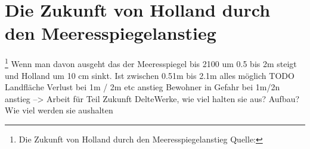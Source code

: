 \section{Die Zukunft von Holland durch den Meeresspiegelanstieg} \footnote{Die Zukunft von Holland durch den Meeresspiegelanstieg Quelle: }
Wenn man davon ausgeht das der Meeresspiegel bis 2100 um 0.5 bis 2m steigt und Holland um 10 cm sinkt.
Ist zwischen 0.51m bis 2.1m alles möglich 
\newline
\newline
\color{red}  
TODO \newline
Landfläche Verlust bei 1m / 2m etc anstieg
Bewohner in Gefahr bei 1m/2n anstieg
--> Arbeit für Teil Zukunft
\newline
DelteWerke, wie viel halten sie aus?
Aufbau? Wie viel werden sie aushalten
